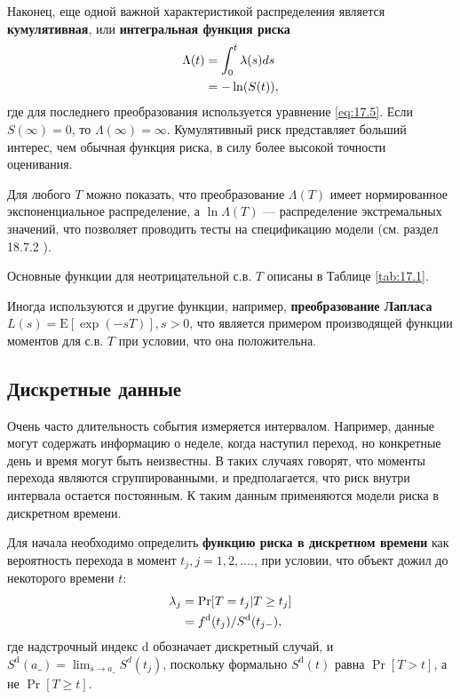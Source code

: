 Наконец, еще одной важной характеристикой распределения является \textbf{кумулятивная}, или \textbf{интегральная функция риска}
    \begin{align}
    \label{eq:17.6}
    \Lambda(t) &= \int^{t}_{0} \lambda(s)ds \\
    &= - \ln(S(t)), \notag
    \end{align}
где для последнего преобразования используется уравнение \ref{eq:17.5}. Если $S(\infty)=0$, то $\Lambda(\infty)=\infty$. Кумулятивный риск представляет больший интерес, чем обычная функция риска, в силу более высокой точности оценивания.

Для любого $T$ можно показать, что преобразование $\Lambda(T)$ имеет нормированное экспоненциальное распределение, а $\ln\Lambda(T)$ --- распределение экстремальных значений, что позволяет проводить тесты на спецификацию модели (см. раздел 18.7.2
).

Основные функции для неотрицательной с.в. $T$ описаны в Таблице \ref{tab:17.1}.

Иногда используются и другие функции, например, \textbf{преобразование Лапласа} $L(s)=\mathrm{E}[\exp{(-sT)}], s>0$, что является примером производящей функции моментов для с.в. $T$ при условии, что она положительна.


\subsection{Дискретные данные}\label{sec:17.3.2}

\noindent
Очень часто длительность события измеряется интервалом. Например, данные могут содержать информацию о неделе, когда наступил переход, но конкретные день и время могут быть неизвестны. В таких случаях говорят, что моменты перехода являются сгруппированными, и предполагается, что риск внутри интервала остается постоянным. К таким данным применяются модели риска в дискретном времени.

Для начала необходимо определить \textbf{функцию риска в дискретном времени} как вероятность перехода в момент $t_j,j=1,2, \ldots .$, при условии, что объект дожил до некоторого времени $t$:
    \begin{align}
    \label{eq:17.7}
    \lambda_j &= \Pr[T = t_j|T \ge t_j]\\
    &= f^{\mathrm{d}} (t_j)/S^{\mathrm{d}}(t_{j-}), \notag
    \end{align}
где надстрочный индекс d обозначает дискретный случай, и $S^\mathrm{d}(a\_)=\lim_{s\rightarrow a\_}{S^d(t_j)}$, поскольку формально $S^\mathrm{d}(t)$ равна $\Pr{[T>t]}$, а не $\Pr{[T\ge t]}$.

